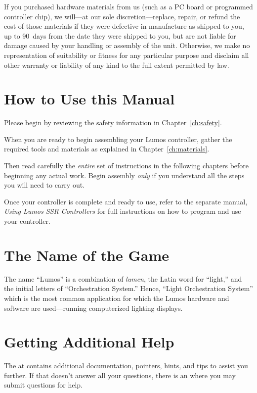 \documentclass[letterpaper,twoside,onecolumn,openright,final]{memoir}
\begin{document}
If you purchased hardware materials from us (such as a PC board or programmed controller chip),
we will---at our sole discretion---replace, repair, or refund the cost of those materials if they were defective in manufacture
as shipped to you, up to 90~days from the date they were shipped to you,
but are not liable for damage caused by your handling or assembly of the unit.
Otherwise, we make no representation of suitability or fitness for any particular purpose and disclaim
all other warranty or liability of any kind to the full extent permitted by law.

\section{How to Use this Manual}
Please begin by reviewing the safety information in Chapter~\ref{ch:safety}.  

When you are ready to begin assembling your Lumos controller, gather the required tools and materials
as explained in Chapter~\ref{ch:materials}.  

Then read carefully the \emph{entire} set of instructions in the following chapters before
beginning any actual work.  Begin assembly \emph{only} if you understand all the steps you will need
to carry out.

Once your controller is complete and ready to use, refer to the separate manual,
\emph{Using Lumos SSR Controllers} for full instructions on how to program
and use your controller.

\section{The Name of the Game}
The name ``Lumos'' is a combination of \emph{lumen}, the Latin word for ``light,''
and the initial letters of ``Orchestration System.''  Hence, ``Light Orchestration System''
which is the most common application for which the Lumos hardware and software are used---running
computerized lighting displays.

\section{Getting Additional Help}
The  at  contains additional documentation,
pointers, hints, and tips to assist you further.  If that doesn't answer all your questions,
there is an  where you may submit questions for help.
\end{document}
